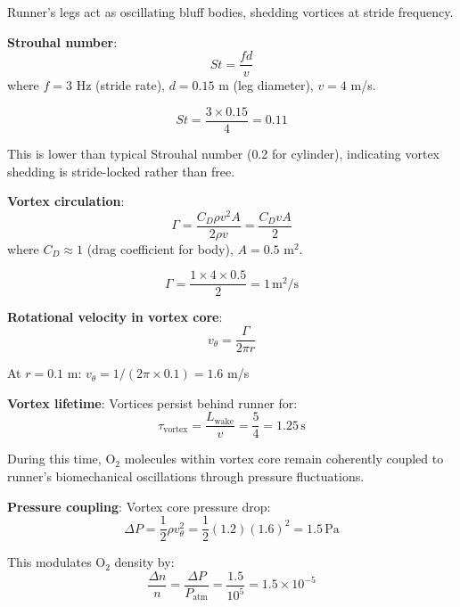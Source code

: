 \documentclass[11pt,onecolumn]{article}
\begin{document}
Runner's legs act as oscillating bluff bodies, shedding vortices at stride frequency.

\textbf{Strouhal number}:
\begin{equation}
St = \frac{f d}{v}
\end{equation}
where $f = 3$ Hz (stride rate), $d = 0.15$ m (leg diameter), $v = 4$ m/s.

\begin{equation}
St = \frac{3 \times 0.15}{4} = 0.11
\end{equation}

This is lower than typical Strouhal number (0.2 for cylinder), indicating vortex shedding is stride-locked rather than free.

\textbf{Vortex circulation}:
\begin{equation}
\Gamma = \frac{C_D \rho v^2 A}{2\rho v} = \frac{C_D v A}{2}
\end{equation}
where $C_D \approx 1$ (drag coefficient for body), $A = 0.5$ m$^2$.

\begin{equation}
\Gamma = \frac{1 \times 4 \times 0.5}{2} = 1\,\text{m}^2\text{/s}
\end{equation}

\textbf{Rotational velocity in vortex core}:
\begin{equation}
v_{\theta} = \frac{\Gamma}{2\pi r}
\end{equation}

At $r = 0.1$ m: $v_{\theta} = 1/(2\pi \times 0.1) = 1.6$ m/s

\textbf{Vortex lifetime}:
Vortices persist behind runner for:
\begin{equation}
\tau_{\text{vortex}} = \frac{L_{\text{wake}}}{v} = \frac{5}{4} = 1.25\,\text{s}
\end{equation}

During this time, O$_2$ molecules within vortex core remain coherently coupled to runner's biomechanical oscillations through pressure fluctuations.

\textbf{Pressure coupling}:
Vortex core pressure drop:
\begin{equation}
\Delta P = \frac{1}{2}\rho v_{\theta}^2 = \frac{1}{2}(1.2)(1.6)^2 = 1.5\,\text{Pa}
\end{equation}

This modulates O$_2$ density by:
\begin{equation}
\frac{\Delta n}{n} = \frac{\Delta P}{P_{\text{atm}}} = \frac{1.5}{10^5} = 1.5 \times 10^{-5}
\end{equation}
\end{document}
